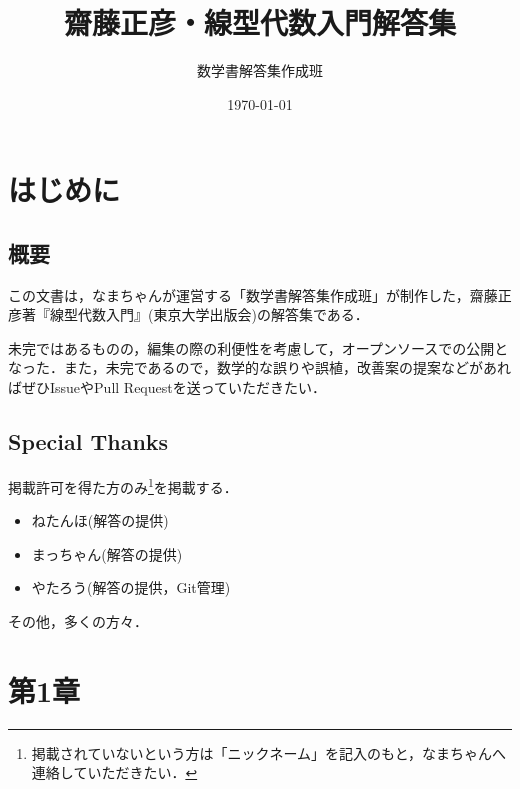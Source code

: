 \documentclass[uplatex,dvipdfmx,a4paper,10pt,fleqn]{jsarticle}
\begin{document}
\title{齋藤正彦・線型代数入門解答集}
\author{数学書解答集作成班}
\date{\today}
\maketitle
\begin{multicols*}{3}
    \tableofcontents
\end{multicols*}

\newpage

\section*{はじめに}


\subsection*{概要}

この文書は，なまちゃんが運営する「数学書解答集作成班」が制作した，齋藤正彦著『線型代数入門』(東京大学出版会)の解答集である．

未完ではあるものの，編集の際の利便性を考慮して，オープンソースでの公開となった．また，未完であるので，数学的な誤りや誤植，改善案の提案などがあればぜひIssueやPull Requestを送っていただきたい．


\subsection*{Special Thanks}

掲載許可を得た方のみ\footnote{掲載されていないという方は「ニックネーム」を記入のもと，なまちゃんへ連絡していただきたい．}を掲載する．
\begin{itemize}
    \item ねたんほ(解答の提供)
    \item まっちゃん(解答の提供)
    \item やたろう(解答の提供，Git管理)
\end{itemize}

その他，多くの方々．

\newpage 
\section*{第1章}
\end{document}
